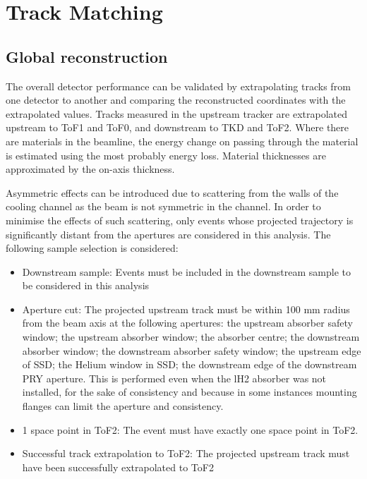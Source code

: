 \graphicspath{{08-Track-matching/Figures/}}

\section{Track Matching}
\label{Sect:TM}


\newcommand{\topmatterallplots}[4]{%
    \hspace*{-2.0cm}\texttt{[image: \#1/Figures/\#2/\#3.pdf]}
    \caption{#4 \label{fig:#3}}
    }

\subsection{Global reconstruction}

The overall detector performance can be validated by extrapolating tracks from
one detector to another and comparing the reconstructed coordinates with the 
extrapolated values. Tracks measured in
the upstream tracker are extrapolated upstream to ToF1 and ToF0, and downstream
to TKD and ToF2. Where there are materials in the beamline, the energy change on
passing through the material is estimated using the most probably energy loss. 
Material thicknesses are approximated by the on-axis thickness. 

Asymmetric effects can be introduced due to scattering from the walls of the
cooling channel as the beam is not symmetric in the channel. In order to 
minimise the effects of such scattering, only events whose projected 
trajectory is  significantly distant from the apertures are considered in this 
analysis. The following sample selection is considered:

\begin{itemize}
\item{Downstream sample:} Events must be included in the downstream sample to
be considered in this analysis
\item{Aperture cut:} The projected upstream track must be within 100 mm radius 
from the beam axis at the following apertures: the upstream absorber safety window;
the upstream absorber window; the absorber centre; the downstream absorber window;
the downstream absorber safety window; the upstream edge of SSD; the Helium window
in SSD; the downstream edge of the downstream PRY aperture. This is performed
even when the lH2 absorber was not installed, for the sake of consistency and
because in some instances mounting flanges can limit the aperture and consistency.
\item{1 space point in ToF2:} The event must have exactly one space point in ToF2.
\item{Successful track extrapolation to ToF2:} The projected upstream track must
have been successfully extrapolated to ToF2
\end{itemize}

